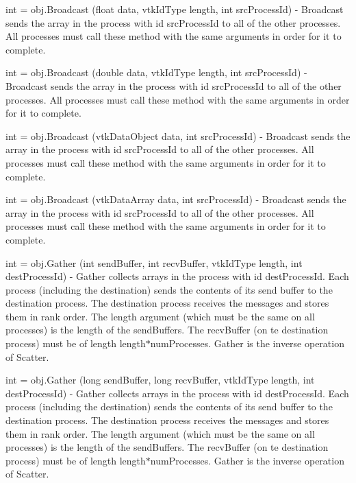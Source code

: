 \begin{DoxyItemize}
\item {\ttfamily int = obj.\-Broadcast (float data, vtk\-Id\-Type length, int src\-Process\-Id)} -\/ Broadcast sends the array in the process with id {\ttfamily src\-Process\-Id} to all of the other processes. All processes must call these method with the same arguments in order for it to complete.  
\item {\ttfamily int = obj.\-Broadcast (double data, vtk\-Id\-Type length, int src\-Process\-Id)} -\/ Broadcast sends the array in the process with id {\ttfamily src\-Process\-Id} to all of the other processes. All processes must call these method with the same arguments in order for it to complete.  
\item {\ttfamily int = obj.\-Broadcast (vtk\-Data\-Object data, int src\-Process\-Id)} -\/ Broadcast sends the array in the process with id {\ttfamily src\-Process\-Id} to all of the other processes. All processes must call these method with the same arguments in order for it to complete.  
\item {\ttfamily int = obj.\-Broadcast (vtk\-Data\-Array data, int src\-Process\-Id)} -\/ Broadcast sends the array in the process with id {\ttfamily src\-Process\-Id} to all of the other processes. All processes must call these method with the same arguments in order for it to complete.  
\item {\ttfamily int = obj.\-Gather (int send\-Buffer, int recv\-Buffer, vtk\-Id\-Type length, int dest\-Process\-Id)} -\/ Gather collects arrays in the process with id {\ttfamily dest\-Process\-Id}. Each process (including the destination) sends the contents of its send buffer to the destination process. The destination process receives the messages and stores them in rank order. The {\ttfamily length} argument (which must be the same on all processes) is the length of the send\-Buffers. The {\ttfamily recv\-Buffer} (on te destination process) must be of length length$\ast$num\-Processes. Gather is the inverse operation of Scatter.  
\item {\ttfamily int = obj.\-Gather (long send\-Buffer, long recv\-Buffer, vtk\-Id\-Type length, int dest\-Process\-Id)} -\/ Gather collects arrays in the process with id {\ttfamily dest\-Process\-Id}. Each process (including the destination) sends the contents of its send buffer to the destination process. The destination process receives the messages and stores them in rank order. The {\ttfamily length} argument (which must be the same on all processes) is the length of the send\-Buffers. The {\ttfamily recv\-Buffer} (on te destination process) must be of length length$\ast$num\-Processes. Gather is the inverse operation of Scatter.  

\end{DoxyItemize}
